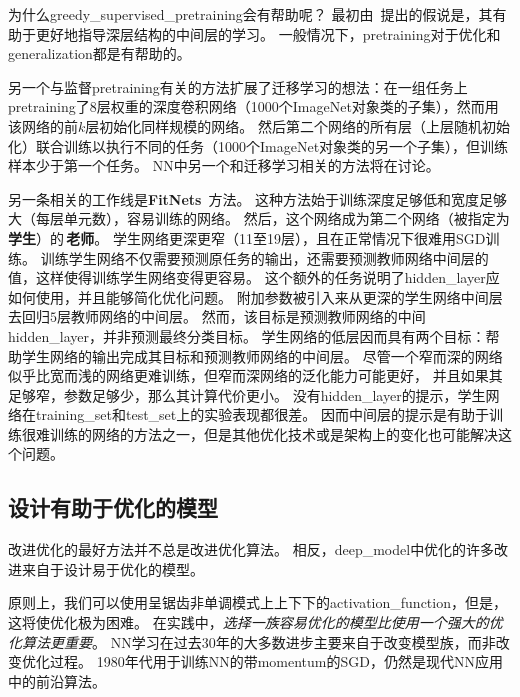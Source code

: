为什么\gls{greedy_supervised_pretraining}会有帮助呢？
最初由~\cite{Bengio-et-al-2007}提出的假说是，其有助于更好地指导深层结构的中间层的学习。
一般情况下，\gls{pretraining}对于优化和\gls{generalization}都是有帮助的。

另一个与监督\gls{pretraining}有关的方法扩展了迁移学习的想法：\cite{Yosinski-et-al-2014}在一组任务上\gls{pretraining}了$8$层权重的深度卷积网络（1000个ImageNet对象类的子集），然而用该网络的前$k$层初始化同样规模的网络。
然后第二个网络的所有层（上层随机初始化）联合训练以执行不同的任务（1000个ImageNet对象类的另一个子集），但训练样本少于第一个任务。
\gls{NN}中另一个和迁移学习相关的方法将在讨论。

另一条相关的工作线是\textbf{FitNets}~\citep{Romero-et-al-2015}方法。
这种方法始于训练深度足够低和宽度足够大（每层单元数），容易训练的网络。
然后，这个网络成为第二个网络（被指定为\,\textbf{学生}）的\,\textbf{老师}。
学生网络更深更窄（11至19层），且在正常情况下很难用SGD训练。
训练学生网络不仅需要预测原任务的输出，还需要预测教师网络中间层的值，这样使得训练学生网络变得更容易。
这个额外的任务说明了\gls{hidden_layer}应如何使用，并且能够简化优化问题。
附加参数被引入来从更深的学生网络中间层去回归$5$层教师网络的中间层。
然而，该目标是预测教师网络的中间\gls{hidden_layer}，并非预测最终分类目标。
学生网络的低层因而具有两个目标：帮助学生网络的输出完成其目标和预测教师网络的中间层。
尽管一个窄而深的网络似乎比宽而浅的网络更难训练，但窄而深网络的泛化能力可能更好，
并且如果其足够窄，参数足够少，那么其计算代价更小。
没有\gls{hidden_layer}的提示，学生网络在\gls{training_set}和\gls{test_set}上的实验表现都很差。
因而中间层的提示是有助于训练很难训练的网络的方法之一，但是其他优化技术或是架构上的变化也可能解决这个问题。


\subsection{设计有助于优化的模型}
\label{sec:designing_models_to_aid_optimization}
改进优化的最好方法并不总是改进优化算法。
相反，\gls{deep_model}中优化的许多改进来自于设计易于优化的模型。

原则上，我们可以使用呈锯齿非单调模式上上下下的\gls{activation_function}，但是，这将使优化极为困难。
在实践中，\emph{选择一族容易优化的模型比使用一个强大的优化算法更重要}。
\gls{NN}学习在过去30年的大多数进步主要来自于改变模型族，而非改变优化过程。
1980年代用于训练\gls{NN}的带\gls{momentum}的\gls{SGD}，仍然是现代\gls{NN}应用中的前沿算法。

